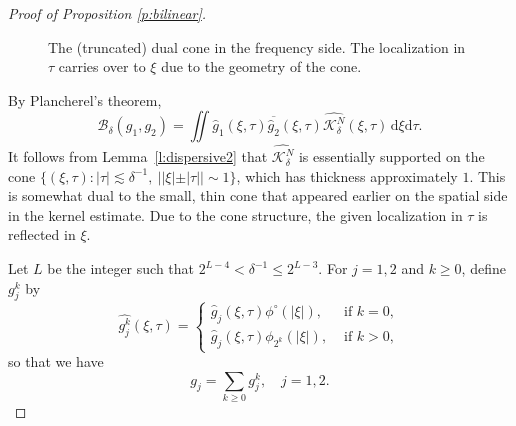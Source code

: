 \documentclass[a4paper]{amsart}
\numberwithin{figure}{section}
\numberwithin{equation}{section}%
\theoremstyle{plain}%
\theoremstyle{definition}
\theoremstyle{remark}%
\def\d{\mathrm{d}}
\begin{document}
\begin{proof}[Proof of Proposition \ref{p:bilinear}]
\begin{figure}

\caption{
The (truncated) dual cone in the frequency side. The localization in $\tau$ carries over to $\xi$ due to the geometry of the cone.
}
\label{f:cone}
\end{figure}
 

By Plancherel's theorem,
\begin{equation}
\label{e:ft}
\mathcal B_\delta(g_1,g_2)= \iint \widehat{g}_1(\xi,\tau) \overline{{\widehat{g}}_2}(\xi,\tau)\widehat{\mathcal K_\delta^N}(\xi,\tau)\,\d\xi\d\tau.
\end{equation}
It follows from Lemma~\ref{l:dispersive2} that $\widehat{\mathcal K_\delta^N}$ 
is essentially supported on the cone $\{(\xi,\tau): |\tau|\lesssim \delta^{-1}, ~||\xi|\pm|\tau||\sim 1\}$, which has thickness approximately $1$.  
This is somewhat dual to the small, thin cone that appeared earlier on the spatial side in the kernel estimate. 
Due to the cone structure, the given localization in $\tau$ is reflected in $\xi$. 

Let $L$ be the integer such that $2^{L-4}< \delta^{-1} \le 2^{L-3}$. 
For $j=1,2$ and $k\ge 0$, 
define $g_j^k$ by 
\[
\widehat{g_j^k} (\xi,\tau)=
\begin{cases} 
\widehat{g}_j(\xi,\tau)\phi^\circ(|\xi|),   & \text{ if }  k=0,
\\[3pt]
\widehat{g}_j(\xi,\tau)\phi_{2^k}(|\xi|),  & \text{ if }  k>0,
\end{cases}
\]
so that we have
\[
{g}_j=\sum_{k\ge 0} {g}_j^k, \quad j=1,2. 
\]



\end{proof}
\end{document}
